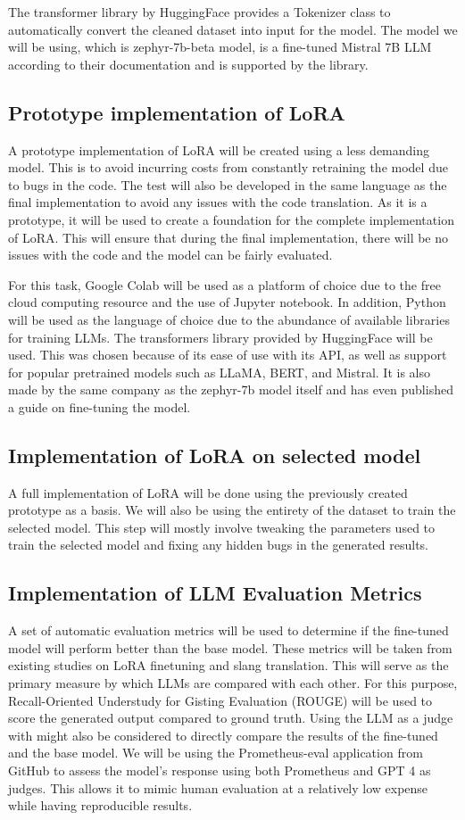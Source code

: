 The transformer library by HuggingFace provides a Tokenizer class to automatically convert the cleaned dataset into input for the model.
The model we will be using, which is zephyr-7b-beta model, is a fine-tuned Mistral 7B LLM according to their documentation and is supported by the library.

\subsection{Prototype implementation of LoRA}
A prototype implementation of LoRA will be created using a less demanding model.
This is to avoid incurring costs from constantly retraining the model due to bugs in the code.
The test will also be developed in the same language as the final implementation to avoid any issues with the code translation.
As it is a prototype, it will be used to create a foundation for the complete implementation of LoRA.
This will ensure that during the final implementation, there will be no issues with the code and the model can be fairly evaluated.

For this task, Google Colab will be used as a platform of choice due to the free cloud computing resource and the use of Jupyter notebook.
In addition, Python will be used as the language of choice due to the abundance of available libraries for training LLMs. The transformers library provided by HuggingFace will be used.
This was chosen because of its ease of use with its API, as well as support for popular pretrained models such as LLaMA, BERT, and Mistral.
It is also made by the same company as the zephyr-7b model itself and has even published a guide on fine-tuning the model.

\subsection{Implementation of LoRA on selected model}
A full implementation of LoRA will be done using the previously created prototype as a basis.
We will also be using the entirety of the dataset to train the selected model.
This step will mostly involve tweaking the parameters used to train the selected model and fixing any hidden bugs in the generated results.

\subsection{Implementation of LLM Evaluation Metrics}
A set of automatic evaluation metrics will be used to determine if the fine-tuned model will perform better than the base model.
These metrics will be taken from existing studies on LoRA finetuning and slang translation.
This will serve as the primary measure by which LLMs are compared with each other.
For this purpose, Recall-Oriented Understudy for Gisting Evaluation (ROUGE) will be used to score the generated output compared to ground truth.
Using the LLM as a judge with might also be considered to directly compare the results of the fine-tuned and the base model.
We will be using the Prometheus-eval application from GitHub to assess the model's response using both Prometheus and GPT 4 as judges.
This allows it to mimic human evaluation at a relatively low expense while having reproducible results.

